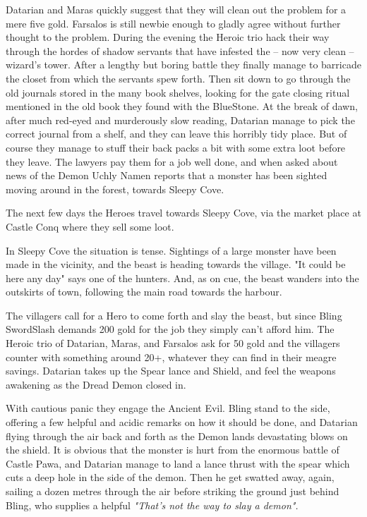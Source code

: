 Datarian and Maras quickly suggest that they will clean out the problem for a mere five gold. Farsalos is still newbie enough to gladly agree without further thought to the problem.
During the evening the Heroic trio hack their way through the hordes of shadow servants that have infested the -- now very clean -- wizard's tower. After a lengthy but boring battle they finally manage to barricade the closet from which the servants spew forth. Then sit down to go through the old journals stored in the many book shelves, looking for the gate closing ritual mentioned in the old book they found with the BlueStone. At the break of dawn, after much red-eyed and murderously slow reading, Datarian manage to pick the correct journal from a shelf, and they can leave this horribly tidy place.
But of course they manage to stuff their back packs a bit with some extra loot before they leave.
The lawyers pay them for a job well done, and when asked about news of the Demon Uchly Namen reports that a monster has been sighted moving around in the forest, towards Sleepy Cove.

The next few days the Heroes travel towards Sleepy Cove, via the market place at Castle Conq where they sell some loot.

In Sleepy Cove the situation is tense. Sightings of a large monster have been made in the vicinity, and the beast is heading towards the village. "It could be here any day" says one of the hunters.
And, as on cue, the beast wanders into the outskirts of town, following the main road towards the harbour.

The villagers call for a Hero to come forth and slay the beast, but since Bling SwordSlash demands 200 gold for the job they simply can't afford him. The Heroic trio of Datarian, Maras, and Farsalos ask for 50 gold and the villagers counter with something around 20+, whatever they can find in their meagre savings.
Datarian takes up the Spear lance and Shield, and feel the weapons awakening as the Dread Demon closed in.

With cautious panic they engage the Ancient Evil. Bling stand to the side, offering a few helpful and acidic remarks on how it should be done, and Datarian flying through the air back and forth as the Demon lands devastating blows on the shield.
It is obvious that the monster is hurt from the enormous battle of Castle Pawa, and Datarian manage to land a lance thrust with the spear which cuts a deep hole in the side of the demon. Then he get swatted away, again, sailing a dozen metres through the air before striking the ground just behind Bling, who supplies a helpful \emph{"That's not the way to slay a demon".}


